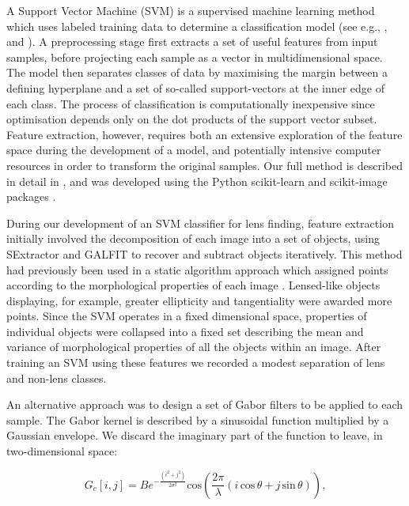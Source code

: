 \documentclass[useAMS,usenatbib]{mnras}
\begin{document}
A Support Vector Machine (SVM) is a supervised machine learning method which uses labeled training data to determine a classification model (see e.g., \citet{vapnik79estimation}, \citet{Cortes1995} and \citet{Burges1998}). A preprocessing stage first extracts a set of useful features from input samples, before projecting each sample as a vector in multidimensional space. The model then separates classes of data by maximising the margin between a defining hyperplane and a set of so-called support-vectors at the inner edge of each class. The process of classification is computationally inexpensive since optimisation depends only on the dot products of the support vector subset. Feature extraction, however,  requires both an extensive exploration of the feature space during the development of a model, and potentially intensive computer resources in order to transform the original samples. Our full method is described in detail in \citet{hartley2017support}, and was developed using the Python scikit-learn and scikit-image packages \citep{scikit-learn,scikit-image}.

During our development of an SVM classifier for lens finding, feature extraction initially involved the decomposition of each image into a set of objects, using SExtractor \citep{1996A&AS..117..393B} and GALFIT \citep{2002AJ....124..266P} to recover and subtract objects iteratively. This method had previously been used in a static algorithm approach which assigned points according to the morphological properties of each image \citep[see][]{2014A&A...566A..63J}. Lensed-like objects displaying, for example, greater ellipticity and tangentiality were awarded more points. Since the SVM operates in a fixed dimensional space,  properties of individual objects were collapsed into a fixed set describing the mean and variance of morphological properties of all the objects within an image. After training an SVM using these features we recorded a modest separation of lens and non-lens classes.

An alternative approach was to design a set of Gabor filters to be applied to each sample. The Gabor kernel is described by a sinusoidal function multiplied by a Gaussian envelope. We discard the imaginary part of the function to leave, in two-dimensional space:

\begin{equation}
G_c[i,j]=Be^{-\frac{(i^2+j^2)}{2\sigma^2}} \mathrm{cos}\left(\frac{2\pi}{\lambda} (i\, \mathrm{cos} \, \theta + j\, \mathrm{sin} \,\theta)\right),
\end{equation}
\end{document}
